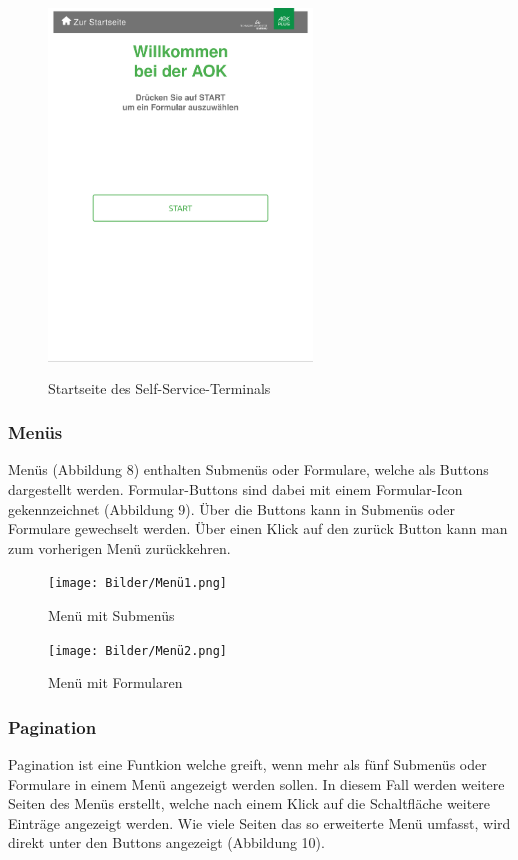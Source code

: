 \begin{figure}[htp]
    \centering
    \includegraphics[width=7cm , height=10cm]{Bilder/Startseite.png}
    \caption[Startseite des Self-Service-Terminals]{Startseite des Self-Service-Terminals}
    \label{fig:SSTStart}
\end{figure}

\newpage

\subsubsection{Menüs}Menüs (Abbildung 8) enthalten Submenüs oder Formulare, welche als Buttons dargestellt werden. Formular-Buttons sind dabei mit einem Formular-Icon gekennzeichnet (Abbildung 9). Über die Buttons kann in Submenüs oder Formulare gewechselt werden. Über einen Klick auf den \glqq zurück\grqq{} Button kann man zum vorherigen Menü zurückkehren.

\begin{figure}[htp]
    \centering
    \texttt{[image: Bilder/Menü1.png]}
    \caption[Startseite des Self-Service-Terminals]{Menü mit Submenüs}
    \label{fig:SSTMenüSubmenü}
\end{figure}

\begin{figure}[htp]
    \centering
    \texttt{[image: Bilder/Menü2.png]}
    \caption[Startseite des Self-Service-Terminals]{Menü mit Formularen}
    \label{fig:SSTMenüFormulare}
\end{figure}

\newpage

\subsubsection{Pagination} Pagination ist eine Funtkion welche greift, wenn mehr als fünf Submenüs oder Formulare in einem Menü angezeigt werden sollen. In diesem Fall werden weitere Seiten des Menüs erstellt, welche nach einem Klick auf die Schaltfläche \glqq weitere Einträge\grqq{} angezeigt werden. Wie viele Seiten das so erweiterte Menü umfasst, wird direkt unter den Buttons angezeigt (Abbildung 10).

